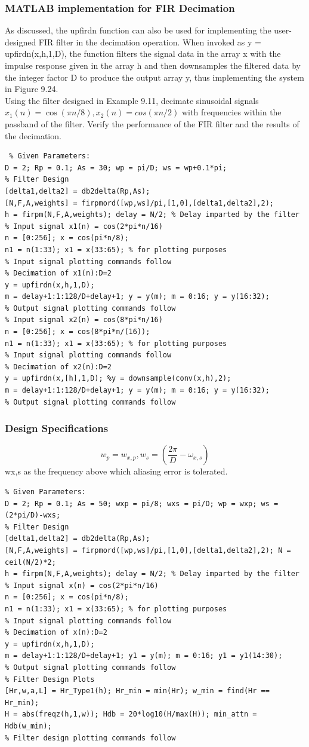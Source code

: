 \documentclass{article}
\begin{document}
\subsubsection{MATLAB implementation for FIR Decimation}
As discussed, the upfirdn function can
also be used for implementing the user-designed FIR filter in the decimation operation. When invoked as y = upfirdn(x,h,1,D), the function
filters the signal data in the array x with the impulse response given in the
array h and then downsamples the filtered data by the integer factor D to
produce the output array y, thus implementing the system in Figure 9.24. \\
\vspace{1em}
Using the filter designed in Example 9.11, decimate sinusoidal signals $x_1(n) =
\cos(\pi n/8), x_2(n) = cos(\pi n/2)$ with frequencies within the passband of
the filter. Verify the performance of the FIR filter and the results of the
decimation.
\begin{lstlisting}
 % Given Parameters:
D = 2; Rp = 0.1; As = 30; wp = pi/D; ws = wp+0.1*pi;
% Filter Design
[delta1,delta2] = db2delta(Rp,As);
[N,F,A,weights] = firpmord([wp,ws]/pi,[1,0],[delta1,delta2],2);
h = firpm(N,F,A,weights); delay = N/2; % Delay imparted by the filter
% Input signal x1(n) = cos(2*pi*n/16)
n = [0:256]; x = cos(pi*n/8);
n1 = n(1:33); x1 = x(33:65); % for plotting purposes
% Input signal plotting commands follow
% Decimation of x1(n):D=2
y = upfirdn(x,h,1,D);   
m = delay+1:1:128/D+delay+1; y = y(m); m = 0:16; y = y(16:32);
% Output signal plotting commands follow
% Input signal x2(n) = cos(8*pi*n/16)
n = [0:256]; x = cos(8*pi*n/(16));
n1 = n(1:33); x1 = x(33:65); % for plotting purposes
% Input signal plotting commands follow
% Decimation of x2(n):D=2
y = upfirdn(x,[h],1,D); %y = downsample(conv(x,h),2);
m = delay+1:1:128/D+delay+1; y = y(m); m = 0:16; y = y(16:32);
% Output signal plotting commands follow
\end{lstlisting}
\subsubsection{Design Specifications}
\begin{equation}
w_p=w_{x,p}, w_s=(\frac{2\pi}{D}-\omega_{x,s})
\end{equation}
wx,s as the frequency above which aliasing error is tolerated.
\begin{lstlisting}
% Given Parameters:
D = 2; Rp = 0.1; As = 50; wxp = pi/8; wxs = pi/D; wp = wxp; ws = (2*pi/D)-wxs;
% Filter Design
[delta1,delta2] = db2delta(Rp,As);
[N,F,A,weights] = firpmord([wp,ws]/pi,[1,0],[delta1,delta2],2); N = ceil(N/2)*2;
h = firpm(N,F,A,weights); delay = N/2; % Delay imparted by the filter
% Input signal x(n) = cos(2*pi*n/16)
n = [0:256]; x = cos(pi*n/8);
n1 = n(1:33); x1 = x(33:65); % for plotting purposes
% Input signal plotting commands follow
% Decimation of x(n):D=2
y = upfirdn(x,h,1,D);
m = delay+1:1:128/D+delay+1; y1 = y(m); m = 0:16; y1 = y1(14:30);
% Output signal plotting commands follow
% Filter Design Plots
[Hr,w,a,L] = Hr_Type1(h); Hr_min = min(Hr); w_min = find(Hr == Hr_min);
H = abs(freqz(h,1,w)); Hdb = 20*log10(H/max(H)); min_attn = Hdb(w_min);
% Filter design plotting commands follow
\end{lstlisting}
\end{document}
